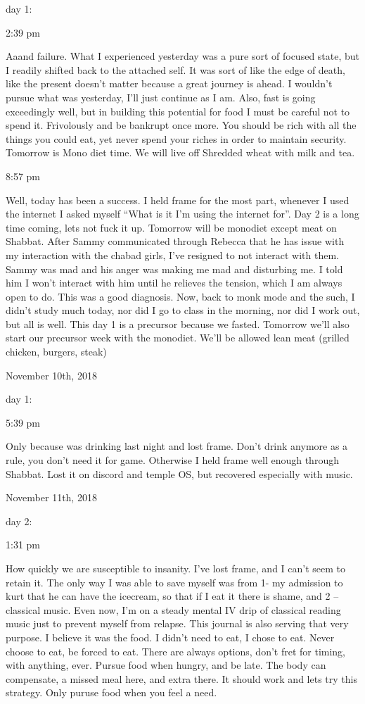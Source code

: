 day 1:

2:39 pm

Aaand failure. What I experienced yesterday was a pure sort of focused
state, but I readily shifted back to the attached self. It was sort of
like the edge of death, like the present doesn't matter because a great
journey is ahead. I wouldn't pursue what was yesterday, I'll just
continue as I am. Also, fast is going exceedingly well, but in building
this potential for food I must be careful not to spend it. Frivolously
and be bankrupt once more. You should be rich with all the things you
could eat, yet never spend your riches in order to maintain security.
Tomorrow is Mono diet time. We will live off Shredded wheat with milk
and tea.

8:57 pm

Well, today has been a success. I held frame for the most part, whenever
I used the internet I asked myself ``What is it I'm using the internet
for''. Day 2 is a long time coming, lets not fuck it up. Tomorrow will
be monodiet except meat on Shabbat. After Sammy communicated through
Rebecca that he has issue with my interaction with the chabad girls,
I've resigned to not interact with them. Sammy was mad and his anger was
making me mad and disturbing me. I told him I won't interact with him
until he relieves the tension, which I am always open to do. This was a
good diagnosis. Now, back to monk mode and the such, I didn't study much
today, nor did I go to class in the morning, nor did I work out, but all
is well. This day 1 is a precursor because we fasted. Tomorrow we'll
also start our precursor week with the monodiet. We'll be allowed lean
meat (grilled chicken, burgers, steak)

\bigskip
\bigskip
November 10th, 2018

day 1:

5:39 pm

Only because was drinking last night and lost frame. Don't drink anymore
as a rule, you don't need it for game. Otherwise I held frame well
enough through Shabbat. Lost it on discord and temple OS, but recovered
especially with music.

\bigskip
\bigskip
November 11th, 2018

day 2:

1:31 pm

How quickly we are susceptible to insanity. I've lost frame, and I can't
seem to retain it. The only way I was able to save myself was from 1- my
admission to kurt that he can have the icecream, so that if I eat it
there is shame, and 2 -- classical music. Even now, I'm on a steady
mental IV drip of classical reading music just to prevent myself from
relapse. This journal is also serving that very purpose. I believe it
was the food. I didn't need to eat, I chose to eat. Never choose to eat,
be forced to eat. There are always options, don't fret for timing, with
anything, ever. Pursue food when hungry, and be late. The body can
compensate, a missed meal here, and extra there. It should work and lets
try this strategy. Only puruse food when you feel a need.


